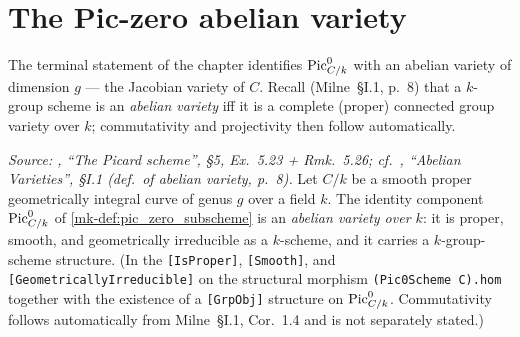 \section{The Pic-zero abelian variety}
\label{mk-sec:pic0_abelian_variety}

The terminal statement of the chapter identifies \(\operatorname{Pic}^0_{C/k}\) with
an abelian variety of dimension \(g\) --- the Jacobian variety of \(C\).
Recall (Milne~\S I.1, p.~8) that a \(k\)-group scheme is an
\emph{abelian variety} iff it is a complete (proper) connected group
variety over \(k\); commutativity and projectivity then follow
automatically.

\begin{theorem}\label{mk-thm:pic_zero_is_abelian_variety}
  \leanok

  \textit{Source: \cite{kleiman-picard}, ``The Picard scheme'', \S 5,
  Ex.~5.23 + Rmk.~5.26; cf.\ \cite{milne-av}, ``Abelian Varieties'',
  \S I.1 (def.\ of abelian variety, p.~8).}
  Let \(C/k\) be a smooth proper geometrically integral curve of genus
  \(g\) over a field \(k\). The identity component \(\operatorname{Pic}^0_{C/k}\) of
  \ref{mk-def:pic_zero_subscheme} is an \emph{abelian variety over
  \(k\)}: it is proper, smooth, and geometrically irreducible as a
  \(k\)-scheme, and it carries a \(k\)-group-scheme structure. (In the
  \texttt{[IsProper]}, \texttt{[Smooth]}, and
  \texttt{[GeometricallyIrreducible]} on the structural morphism
  \texttt{(Pic0Scheme C).hom} together with the existence of a
  \texttt{[GrpObj]} structure on \(\operatorname{Pic}^0_{C/k}\). Commutativity
  follows automatically from Milne~\S I.1, Cor.~1.4 and is not
  separately stated.)
\end{theorem}
